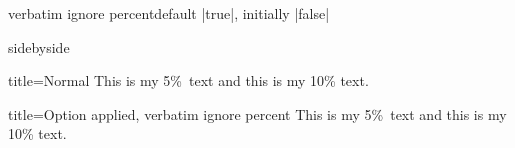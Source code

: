 \begin{docTcbKey}[][doc new=2017-07-05]{verbatim ignore percent}{}{default |true|, initially |false|}
\begin{dispExample*}{sidebyside}
\def\percent{\%}

\begin{tcblisting}{title=Normal}
This is my 5\percent\ text
and this is my 10\% text.
\end{tcblisting}

\begin{tcblisting}{
  title=Option applied,
  verbatim ignore percent}
This is my 5\percent\ text
and this is my 10\% text.
\end{tcblisting}
\end{dispExample*}

\end{docTcbKey}

